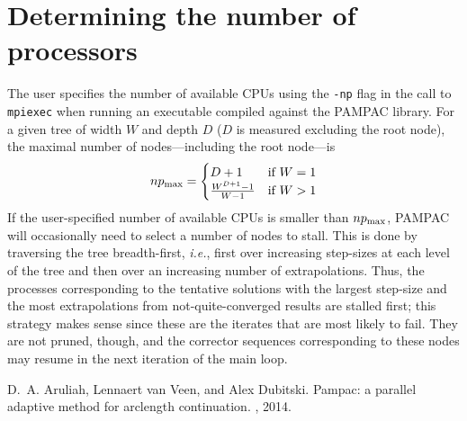 \documentclass{article}
\newcommand{\ie}{\textit{i.e.}}
\newcommand{\pampac}{\textsc{PAMPAC}\xspace}
\begin{document}
\section{Determining the number of processors}

The user specifies the number of available CPUs using the \verb^-np^ flag in the call to \verb^mpiexec^
when running an executable compiled against the \pampac library.
%
For a given tree of width $W$ and depth $D$ ($D$ is measured excluding the root node),
the maximal number of nodes---including the root node---is
$$
np_{\rm max}=\begin{cases} D+1 &\text{if}\ W=1 \\
\frac{W^{D+1}-1}{W-1} &\text{if}\ W>1\end{cases}
$$
If the user-specified number of available CPUs is smaller than $np_{\rm max}$, \pampac will occasionally need to select
a number of nodes to stall. This is done by traversing the tree breadth-first, \ie,
first over increasing step-sizes at each level of the tree and then over an increasing number of extrapolations.
Thus, the processes corresponding to the tentative solutions with the largest step-size and the most extrapolations from not-quite-converged results are stalled first; this strategy makes sense since these are the iterates that are most
likely to fail. They are not pruned, though, and the corrector sequences corresponding to these nodes
may resume in the next iteration of the main loop.

\begin{thebibliography}{1}

D.~A. Aruliah, Lennaert van Veen, and Alex Dubitski.
\newblock Pampac: a parallel adaptive method for arclength continuation.
, 2014.

\end{thebibliography}
\end{document}
